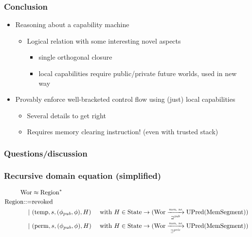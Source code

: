 \documentclass{beamer}
\newcommand{\fun}{\rightarrow}
\newcommand{\var}[1]{\mathit{#1}}
\newcommand{\pub}{\var{pub}}
\newcommand{\futurewk}{\mathbin{\sqsupseteq}^{\var{pub}}}
\newcommand{\futurestr}{\mathbin{\sqsupseteq}^{\var{priv}}}
\newcommand{\monwknefun}{\xrightarrow[\text{\tiny{$\futurewk$}}]{\textit{\tiny{mon, ne}}}}
\newcommand{\monstrnefun}{\xrightarrow[\text{\tiny{$\futurestr$}}]{\textit{\tiny{mon, ne}}}}
\newcommand{\plaindom}[1]{\mathrm{#1}}
\newcommand{\HeapSegments}{\plaindom{MemSegment}}
\newcommand{\States}{\plaindom{State}}
\newcommand{\Wor}{\plaindom{Wor}}
\newcommand{\UPred}[1]{\plaindom{UPred}(#1)}
\newcommand{\plainview}[1]{\mathrm{#1}}
\newcommand{\perma}{\plainview{perm}}
\newcommand{\temp}{\plainview{temp}}
\newcommand{\revoked}{\plainview{revoked}}
\begin{document}
\begin{frame}
  \frametitle{Conclusion}

  \begin{itemize}
  \item Reasoning about a capability machine
    \begin{itemize}
    \item Logical relation with some interesting novel aspects
      \begin{itemize}
      \item single orthogonal closure
      \item local capabilities require public/private future worlds, used in new
        way
      \end{itemize}
    \end{itemize}
  \item Provably enforce well-bracketed control flow using (just) local
    capabilities
    \begin{itemize}
    \item Several details to get right
    \item Requires memory clearing instruction! (even with trusted stack)
    \end{itemize}
  \end{itemize}
\end{frame}

\begin{frame}
  \frametitle{Questions/discussion}
\end{frame}

\begin{frame}
  \frametitle{Recursive domain equation (simplified)}
    {\tiny
      \begin{align*}
        \Wor &\approx \mathrm{Region}^*\\
        \mathrm{Region} \mathbin{::=}&\revoked\\
        \mid\ &(\temp, s, (\phi_\pub,\phi), H ) &\text{ with } H \in \States \fun (\Wor \monwknefun \UPred{\HeapSegments}) \\
        \mid\ &(\perma, s, (\phi_\pub,\phi), H) &\text{ with }  H \in \States \fun (\Wor \monstrnefun \UPred{\HeapSegments})
      \end{align*}}
\end{frame}



% 
\end{document}

